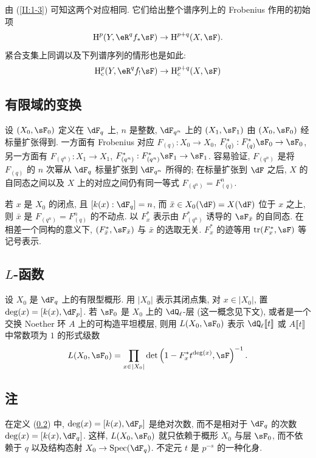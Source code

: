 由 (\ref{II:1-3}) 可知这两个对应相同. 它们给出整个谱序列上的 Frobenius 作用的初始项
\[
  \h^p(Y,\eR^q f_*\sF) \rightarrow \h^{p+q}(X,\sF) \text{.}
\]
紧合支集上同调以及下列谱序列的情形也是如此:
\[
  \h_c^p(Y,\eR^q f_! \sF) \rightarrow \h_c^{p+q}(X,\sF)
\]

\subsection{有限域的变换}\label{II:1-5}

设 $(X_0,\sF_0)$ 定义在 $\dF_q$ 上, $n$ 是整数, $\dF_{q^n}$ 上的 $(X_1,\sF_1)$ 由 $(X_0,\sF_0)$ 经标量扩张得到. 一方面有 Frobenius 对应 $F_{(q)}:X_0\to X_0$, $F_{(q)}^*:F_{(q)}^*\sF_0\to \sF_0$, 另一方面有 $F_{(q^n)}:X_1\to X_1$, $F_{(q^n)}^*:F_{(q^n)}^*\sF_1\to\sF_1$. 容易验证, $F_{(q^n)}$ 是将 $F_{(q)}$ 的 $n$ 次幂从 $\dF_q$ 标量扩张到 $\dF_{q^n}$ 所得的; 在标量扩张到 $\dF$ 之后, $X$ 的自同态之间以及 $X$ 上的对应之间仍有同一等式 $F_{(q^n)}=F_{(q)}^n$.

若 $x$ 是 $X_0$ 的闭点, 且 $[k(x):\dF_q]=n$, 而 $\bar x\in X_0(\dF) = X(\dF)$ 位于 $x$ 之上, 则 $\bar x$ 是 $F_{(q^n)}=F_{(q)}^n$ 的不动点. 以 $F_x^*$ 表示由 $F_{(q^n)}^*$ 诱导的 $\sF_{\bar x}$ 的自同态. 在相差一个同构的意义下, $(F_{\bar x}^*,\sF_{\bar x})$ 与 $\bar x$ 的选取无关. $F_x^*$ 的迹等用 $\tr(F_x^*,\sF)$ 等记号表示.

\subsection{\texorpdfstring{$L$}{L}-函数}\label{II:1-6}

设 $X_0$ 是 $\dF_q$ 上的有限型概形. 用 $|X_0|$ 表示其闭点集, 对 $x\in |X_0|$, 置 $\deg(x)=[k(x),\dF_p]$. 若 $\sF_0$ 是 $X_0$ 上的 $\dQ_\ell$-层 (这一概念见下文), 或者是一个交换 Noether 环 $A$ 上的可构造平坦模层, 则用 $L(X_0,\sF_0)$ 表示 $\dQ_\ell\llbracket t\rrbracket$ 或 $A\llbracket t\rrbracket$ 中常数项为 $1$ 的形式级数
\[
  L(X_0,\sF_0) = \prod_{x\in|X_0|} \det\left(1-F_x^* t^{\deg(x)},\sF\right)^{-1} \text{.}
\]

\subsection{注}\label{II:1-7}

在定义 (\ref{II:1-6}) 中, $\deg(x)=[k(x),\dF_p]$ 是绝对次数, 而不是相对于 $\dF_q$ 的次数 $\deg(x)=[k(x),\dF_q]$. 这样, $L(X_0,\sF_0)$ 就只依赖于概形 $X_0$ 与层 $\sF_0$, 而不依赖于 $q$ 以及结构态射 $X_0\to\spec(\dF_q)$. 不定元 $t$ 是 $p^{-s}$ 的一种化身.

